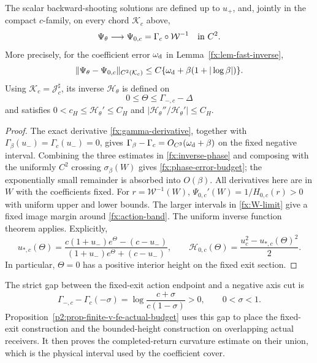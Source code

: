 \begin{proposition}\label{fx:prop-inverse-phase}
The scalar backward-shooting solutions are defined up to \(u_+\),
and, jointly in the compact \(c\)-family, on every chord
\(\mathcal K_c\) above,
\begin{equation}\label{fx:phase-limit}
 \Psi_\theta\longrightarrow
       \Psi_{0,c}=\Gamma_c\circ\mathcal W^{-1}\quad\hbox{in }C^2 .
\end{equation}
More precisely, for the coefficient error \(\omega_{\rm d}\) in
Lemma~\ref{fx:lem-fast-inverse},
\begin{equation}\label{fx:phase-error-budget}
 \|\Psi_\theta-\Psi_{0,c}\|_{C^2(\mathcal K_c)}
 \le C\{\omega_{\rm d}+\beta(1+|\log\beta|)\}.
\end{equation}
Using \(\mathcal K_c=\mathcal J_c^\sharp\), its inverse
\(\mathcal H_\theta\) is defined on
\begin{equation}\label{fx:action-band}
 0\le\Theta\le\Gamma_{-,c}-\Delta
\end{equation}
and satisfies \(0<c_H\le\mathcal H_\theta'\le C_H\) and
\(|\mathcal H_\theta''/\mathcal H_\theta'|\le C_H\).
\end{proposition}
\begin{proof}
The exact derivative \eqref{fx:gamma-derivative}, together with
\(\Gamma_\beta(u_-)=\Gamma_c(u_-)=0\), gives
\(\Gamma_\beta-\Gamma_c=O_{C^3}(\omega_{\rm d}+\beta)\)
on the fixed negative interval.
Combining the three estimates in \eqref{fx:inverse-phase} and composing
with the uniformly \(C^2\) crossing \(\sigma_\beta(W)\) gives
\eqref{fx:phase-error-budget}; the exponentially small remainder
is absorbed into \(O(\beta)\). All derivatives here are in \(W\)
with the coefficients fixed.
For \(r=\mathcal W^{-1}(W)\),
\(\Psi_{0,c}'(W)=1/H_{0,c}(r)>0\) with uniform upper and lower
bounds. The larger intervals in \eqref{fx:W-limit} give a
fixed image margin around \eqref{fx:action-band}.
The uniform inverse function theorem applies. Explicitly,
\[
 u_{*,c}(\Theta)=
 \frac{c(1+u_-)e^\Theta-(c-u_-)}
      {(1+u_-)e^\Theta+(c-u_-)},\qquad
 \mathcal H_{0,c}(\Theta)=\frac{u_c^2-u_{*,c}(\Theta)^2}{2}.
\]
In particular, \(\Theta=0\) has a positive interior height on
the fixed exit section.
\end{proof}

The strict gap between the fixed-exit action endpoint and a negative
axis cut is
\begin{equation}\label{fx:overlap-gap}
 \Gamma_{-,c}-\Gamma_c(-\sigma)
    =\log\frac{c+\sigma}{c(1-\sigma)}>0,\qquad 0<\sigma<1 .
\end{equation}
Proposition~\ref{p2:prop-finite-v-fe-actual-budget} uses this gap to
place the fixed-exit construction and the bounded-height construction
on overlapping actual receivers. It then proves the completed-return
curvature estimate on their union, which is the physical interval used
by the coefficient cover.

